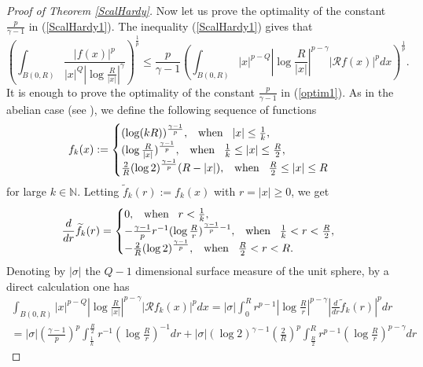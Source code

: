 \documentclass[a4paper,12pt,reqno]{amsart}
\renewcommand\eqref[1]{(\ref{#1})} %
\numberwithin{equation}{section}
\theoremstyle{plain}
\theoremstyle{definition}
\begin{document}
\begin{proof}[Proof of Theorem \ref{ScalHardy}]
Now let us prove the optimality of the constant $\frac{p}{\gamma-1}$ in \eqref{ScalHardy1}. The inequality \eqref{ScalHardy1} gives that
\begin{equation}\label{optim1}
\left(\int_{B(0,R)}\frac{|f(x)|^{p}}{|x|^{Q}\left|\log\frac{R}{|x|}\right|^{\gamma}}\right)^{\frac{1}{p}}
\leq \frac{p}{\gamma-1}\left(\int_{B(0,R)}|x|^{p-Q}\left|\log\frac{R}{|x|}\right|^{p-\gamma}|\mathcal{R}f(x)|^{p}dx\right)^{\frac{1}{p}}.
\end{equation}
It is enough to prove the optimality of the constant $\frac{p}{\gamma-1}$ in \eqref{optim1}. As in the abelian case (see \cite[Section 3]{MOW15}), we define the following sequence of functions
$$f_{k}(x):=\begin{cases}
(\log(kR))^{\frac{\gamma-1}{p}}, \;\;\;{\rm when}\;\;\;|x|\leq\frac{1}{k},\\
(\log\frac{R}{|x|})^{\frac{\gamma-1}{p}}, \;\;\;{\rm when}\;\;\;\frac{1}{k}\leq|x|\leq\frac{R}{2},\\
\frac{2}{R}(\log2)^{\frac{\gamma-1}{p}}(R-|x|), \;\;\;{\rm when}\;\;\;\frac{R}{2}\leq|x|\leq R
\end{cases}$$
for large $k\in \mathbb{N}$. Letting $\widetilde{f}_{k}(r):=f_{k}(x)$ with $r=|x|\geq0$, we get
$$\frac{d}{dr}\widetilde{f}_{k}(r)=\begin{cases}
0, \;\;\;{\rm when}\;\;\;r<\frac{1}{k},\\
-\frac{\gamma-1}{p}r^{-1}(\log\frac{R}{r})^{\frac{\gamma-1}{p}-1}, \;\;\;{\rm when}\;\;\;\frac{1}{k}<r<\frac{R}{2},\\
-\frac{2}{R}(\log2)^{\frac{\gamma-1}{p}}, \;\;\;{\rm when}\;\;\;\frac{R}{2}<r<R.
\end{cases}$$
Denoting by $|\sigma|$ the $Q-1$ dimensional surface measure of the unit sphere,
by a direct calculation one has
\begin{multline*}
\int_{B(0,R)}|x|^{p-Q}
\left|\log\frac{R}{|x|}\right|^{p-\gamma}\left|\mathcal{R}f_{k}(x)\right|
^{p}dx
=|\sigma|\int_{0}^{R}r^{p-1}\left|\log\frac{R}{r}\right|^{p-\gamma}
\left|\frac{d}{dr}\widetilde{f}_{k}(r)\right|^{p}dr\\
=|\sigma|\left(\frac{\gamma-1}{p}\right)^{p}\int_{\frac{1}{k}}^{\frac{R}{2}}r^{-1}\left(\log\frac{ R}{r}\right)^{-1}dr
+|\sigma|(\log2)^{\gamma-1}\left(\frac{2}{R}\right)^{p}
\int_{\frac{R}{2}}^{R}r^{p-1}\left(\log
\frac{R}{r}\right)^{p-\gamma}dr\end{multline*}


\end{proof}
\end{document}
